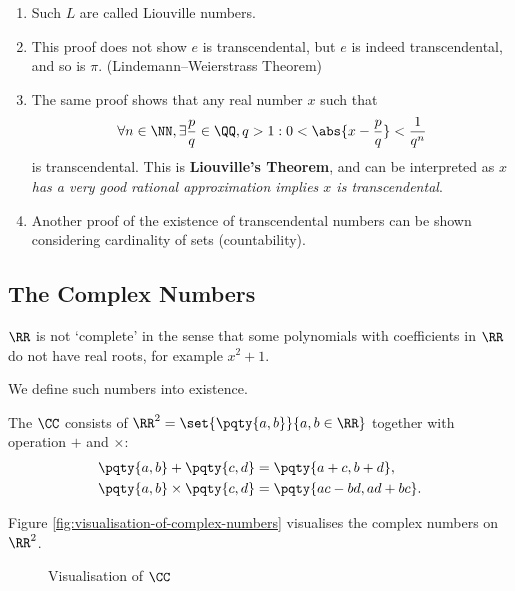 \begin{remarks}
    \begin{enumerate}
        \item Such \(L\) are called Liouville numbers.
        \item This proof does not show \(e\) is transcendental, but \(e\) is indeed transcendental, and so is \(\pi\). (Lindemann--Weierstrass Theorem)
        \item The same proof shows that any real number \(x\) such that
        \[
            \forall n \in \NN, \exists \frac{p}{q} \in \QQ, q > 1: 0 < \abs{x - \frac{p}{q}} < \frac{1}{q^n}
        \]
        is transcendental. This is \textbf{Liouville's Theorem}, and can be interpreted as \emph{\(x\) has a very good rational approximation implies \(x\) is transcendental}.
        \item Another proof of the existence of transcendental numbers can be shown considering cardinality of sets (countability).
    \end{enumerate}
\end{remarks}

\subsection{The Complex Numbers}
\label{sec:complex-numbers}

\(\RR\) is not `complete' in the sense that some polynomials with coefficients in \(\RR\) do not have real roots, for example \(x^2 + 1\).

We define such numbers into existence.

\begin{definition}
    The  \(\CC\) consists of \(\RR^2 = \set{\pqty{a, b}}{a, b \in \RR}\) together with operation \(+\) and \(\times\):
    \begin{align*}
        \pqty{a, b} + \pqty{c, d} &= \pqty{a + c, b + d}, \\
        \pqty{a, b} \times \pqty{c, d} &= \pqty{ac - bd, ad + bc}.
    \end{align*}
\end{definition}

Figure \autoref{fig:visualisation-of-complex-numbers} visualises the complex numbers on \(\RR^2\).

\begin{figure}[ht!]
    \centering
    \caption{Visualisation of \(\CC\)}
    \label{fig:visualisation-of-complex-numbers}
\end{figure}

